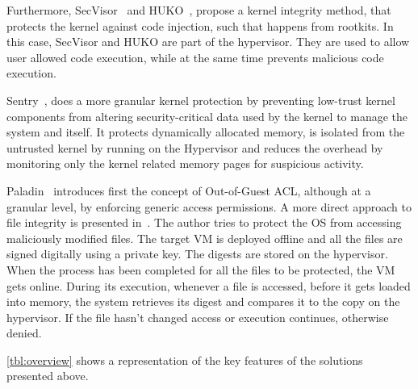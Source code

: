 \par Furthermore, SecVisor~\cite{seshadri2007secvisor} and HUKO~\cite{xiong2011practical}, propose a kernel integrity method, that protects the kernel against code injection, such that happens from rootkits. In this case, SecVisor and HUKO are part of the hypervisor. They are used to allow user allowed code execution, while at the same time prevents malicious code execution.


\par Sentry~\cite{srivastava2012efficient}, does a more granular kernel protection by preventing low-trust kernel components from altering security-critical data used by the kernel to manage the system and itself. It protects dynamically allocated memory, is isolated from the untrusted kernel by running on the Hypervisor and reduces the overhead by monitoring only the kernel related memory pages for suspicious activity.


\par Paladin~\cite{baliga2008automated} introduces first the concept of Out-of-Guest \ac{ACL}, although at a granular level, by enforcing generic access permissions. A more direct approach to file integrity is presented in~\cite{nasab2012security}. The author tries to protect the \ac{OS} from accessing maliciously modified files. The target \ac{VM} is deployed offline and all the files are signed digitally using a private key. The digests are stored on the hypervisor. When the process has been completed for all the files to be protected, the \ac{VM} gets online. During its execution, whenever a file is accessed, before it gets loaded into memory, the system retrieves its digest and compares it to the copy on the hypervisor. If the file hasn’t changed access or execution continues, otherwise denied.

\par \ref{tbl:overview} shows a representation of the key features of the solutions presented above.

